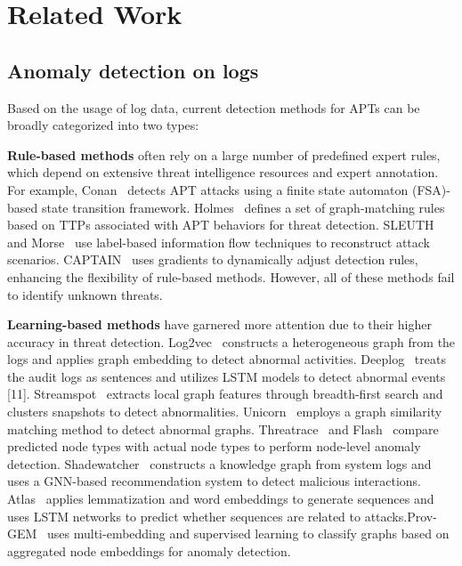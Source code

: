 \section{Related Work}
\subsection{Anomaly detection on logs}
Based on the usage of log data, current detection methods for APTs can be broadly categorized into two types: 

\noindent \textbf{Rule-based methods} often rely on a large number of predefined expert rules, which depend on extensive threat intelligence resources and expert annotation. For example, Conan~\cite{xiong2020conan} detects APT attacks using a finite state automaton (FSA)-based state transition framework. Holmes~\cite{milajerdi2019holmes} defines a set of graph-matching rules based on TTPs associated with APT behaviors for threat detection. SLEUTH~\cite{hossain2017sleuth} and Morse~\cite{hossain2020combating} use label-based information flow techniques to reconstruct attack scenarios. CAPTAIN~\cite{wang2024incorporating} uses gradients to dynamically adjust detection rules, enhancing the flexibility of rule-based methods. However, all of these methods fail to identify unknown threats.

\noindent \textbf{Learning-based methods} have garnered more attention due to their higher accuracy in threat detection. Log2vec~\cite{log2vec} constructs a heterogeneous graph from the logs and applies graph embedding to detect abnormal activities. Deeplog~\cite{deeplog} treats the audit logs as sentences and utilizes LSTM models to detect abnormal events [11]. Streamspot~\cite{manzoor2016streamspot} extracts local graph features through breadth-first search and clusters snapshots to detect abnormalities. Unicorn~\cite{han2020unicorn} employs a graph similarity matching method to detect abnormal graphs. Threatrace~\cite{wang2022threatrace} and Flash~\cite{rehman2024flash} compare predicted node types with actual node types to perform node-level anomaly detection. Shadewatcher~\cite{zengy2022shadewatcher} constructs a knowledge graph from system logs and uses a GNN-based recommendation system to detect malicious interactions. Atlas~\cite{alsaheel2021atlas} applies lemmatization and word embeddings to generate sequences and uses LSTM networks to predict whether sequences are related to attacks.Prov-GEM~\cite{kapoor2021prov} uses multi-embedding and supervised learning to classify graphs based on aggregated node embeddings for anomaly detection.


